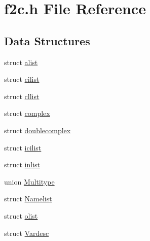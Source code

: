 \hypertarget{dependencies_2third-party_2clapack_23_82_81_2_i_n_c_l_u_d_e_2f2c_8h}{}\section{f2c.\+h File Reference}
\label{dependencies_2third-party_2clapack_23_82_81_2_i_n_c_l_u_d_e_2f2c_8h}
\subsection*{Data Structures}
\begin{DoxyCompactItemize}
\item 
struct \hyperlink{structalist}{alist}
\item 
struct \hyperlink{structcilist}{cilist}
\item 
struct \hyperlink{structcllist}{cllist}
\item 
struct \hyperlink{structcomplex}{complex}
\item 
struct \hyperlink{structdoublecomplex}{doublecomplex}
\item 
struct \hyperlink{structicilist}{icilist}
\item 
struct \hyperlink{structinlist}{inlist}
\item 
union \hyperlink{union_multitype}{Multitype}
\item 
struct \hyperlink{struct_namelist}{Namelist}
\item 
struct \hyperlink{structolist}{olist}
\item 
struct \hyperlink{struct_vardesc}{Vardesc}
\end{DoxyCompactItemize}
